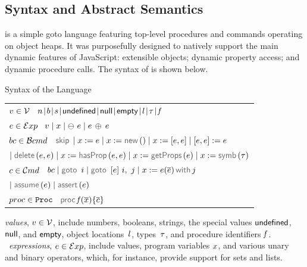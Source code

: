\subsection{\jsil Syntax and Abstract Semantics}\label{subsec:jsil:analysis:formalism}
 
 \jsil is a simple goto language featuring top-level procedures and commands operating on object heaps. It was purposefully designed to natively support the main dynamic features of JavaScript: extensible objects; dynamic property access; and dynamic procedure calls. The syntax of \jsil is shown below. 

\vspace{5pt}
\begin{display}{Syntax of the \jsil Language}{
\begin{tabular}{l}
$v \in \mathcal{V}$ \ $\jnumber \! \mid \! \jbool \! \mid \! \jstring \! \mid \! {\small \jundefined} \! \mid \! {\small \jnull} \! \mid \! {\small \jempty} \! \mid \! \loc \! \mid \! \jtype \! \mid \!  \pid$
   \\[0.1cm]
  $e \in \mathcal{E}xp$ \ $\val \mid \jvar \mid \ominus\ \jsilexpr \mid \jsilexpr \binop{} \jsilexpr$
 \\[0.1cm]
%
$bc \in \mathcal{B}cmd$ \ $\jsilskip \mid \jvar := \jsilexpr  \mid \jvar := \jsilnew() \mid \jvar := [\jsilexpr, \jsilexpr] \mid [\jsilexpr, \jsilexpr] := \jsilexpr $ \\
%
\hspace{0.02cm} $\mid \jsildelete(\jsilexpr, \jsilexpr) \mid \jvar := \hasfield(\jsilexpr, \jsilexpr) \mid \jvar := \getfields(\jsilexpr) \mid \jvar := \makesymbolic(\jtype)$ \\[0.1cm]
$c \in \mathcal{C}md$  \ $ \bcmd \mid \goto \ i \mid  \ifgoto{\jsilexpr}{i}{j} \mid \jsilcall{\jvar}{\jsilexpr}{\jvec{\jsilexpr}}{j}$ \\
\hspace{0.02cm} $ \mid \assume(\jsilexpr) \mid \assert(\jsilexpr)$ \\[0.1cm]
%
$proc \in \mathtt{Proc}$  \ $\procedure{\pid}{\jvec{\jvar}}{\jvec{\jcmd}}$
 \end{tabular}}
\end{display}

\vspace{5pt}
\noindent \jsil \emph{values}, $v \in \mathcal{V}$, include numbers, booleans, strings, the special values ${\sf undefined}$, ${\sf null}$, and ${\sf empty}$, object locations~$l$, types~$\tau$, and procedure identifiers $\mathit{f}$.
\jsil~\emph{expressions}, $e \in \mathcal{E}xp$, include \jsil values, \jsil program variables $x$, and various unary and binary operators, which, for instance, provide support for sets and lists. 

